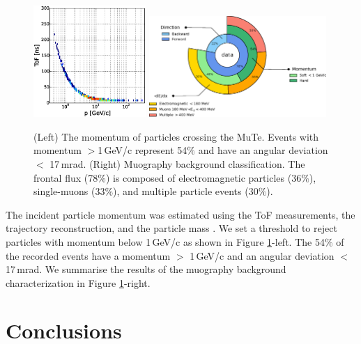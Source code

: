 \documentclass{PoS}
\begin{document}
\begin{figure}[!ht]
\begin{center}
\includegraphics[width=0.38\textwidth]{Figures/ToF_Coarse_Muon.eps}
\includegraphics[width=0.6\textwidth]{Figures/Background_class.eps}
\caption{(Left) The momentum of particles crossing the MuTe. Events with momentum $>$1\,GeV/c represent 54$\%$ and have an angular deviation $<$ 17\,mrad. (Right) Muography background classification. The frontal flux (78$\%$) is composed of electromagnetic particles (36$\%$), single-muons (33$\%$), and multiple particle events (30$\%$).}
\label{Momentum}
\end{center}
\end{figure}

The incident particle momentum was estimated using the ToF measurements, the trajectory reconstruction, and the particle mass \cite{PeaRodrguez2020}. We set a threshold to reject particles with momentum below 1\,GeV/c as shown in Figure \ref{Momentum}-left. The 54$\%$ of the recorded events have a momentum $>$ 1\,GeV/c and an angular deviation $<$ 17\,mrad. We summarise the results of the muography background characterization in Figure \ref{Momentum}-right.


\section{Conclusions}
\end{document}
